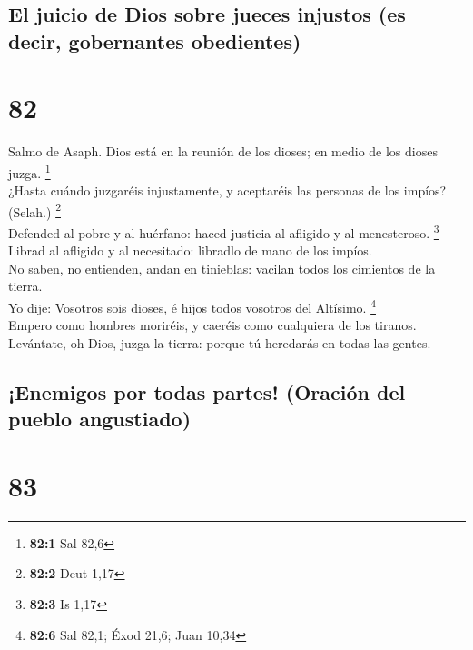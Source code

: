 \hypertarget{el-juicio-de-dios-sobre-jueces-injustos-es-decir-gobernantes-obedientes}{%
\subsection{El juicio de Dios sobre jueces injustos (es decir,
gobernantes
obedientes)}\label{el-juicio-de-dios-sobre-jueces-injustos-es-decir-gobernantes-obedientes}}

\hypertarget{section-81}{%
\section{82}\label{section-81}}

 Salmo de Asaph. Dios está en la reunión de los dioses; en
medio de los dioses juzga. \footnote{\textbf{82:1} Sal 82,6}\\
 ¿Hasta cuándo juzgaréis injustamente, y aceptaréis las
personas de los impíos? (Selah.) \footnote{\textbf{82:2} Deut 1,17}\\
 Defended al pobre y al huérfano: haced justicia al afligido
y al menesteroso. \footnote{\textbf{82:3} Is 1,17}\\
 Librad al afligido y al necesitado: libradlo de mano de los
impíos.\\
 No saben, no entienden, andan en tinieblas: vacilan todos
los cimientos de la tierra.\\
 Yo dije: Vosotros sois dioses, é hijos todos vosotros del
Altísimo. \footnote{\textbf{82:6} Sal 82,1; Éxod 21,6; Juan 10,34}\\
 Empero como hombres moriréis, y caeréis como cualquiera de
los tiranos.\\
 Levántate, oh Dios, juzga la tierra: porque tú heredarás en
todas las gentes.

\hypertarget{enemigos-por-todas-partes-oraciuxf3n-del-pueblo-angustiado}{%
\subsection{¡Enemigos por todas partes! (Oración del pueblo
angustiado)}\label{enemigos-por-todas-partes-oraciuxf3n-del-pueblo-angustiado}}

\hypertarget{section-82}{%
\section{83}\label{section-82}}

